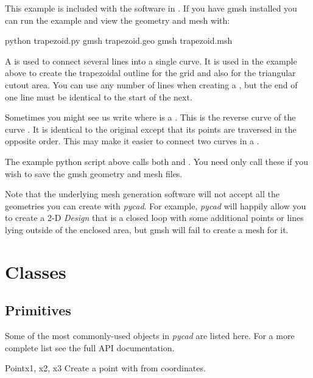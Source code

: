 This example is included with the software in
.  If you have gmsh installed you can
run the example and view the geometry and mesh with:

\begin{python}
	python trapezoid.py
	gmsh trapezoid.geo
	gmsh trapezoid.msh
\end{python}

A  is used to connect several lines into a single curve.
It is used in the example above to create the trapezoidal outline for the grid
and also for the triangular cutout area.
You can use any number of lines when creating a , but
the end of one line must be identical to the start of the next.

Sometimes you might see us write  where  is a
.  This is the reverse curve of the curve . 
It is identical to the original except that its points are traversed
in the opposite order.  This may make it easier to connect two curves
in a .

The example python script above calls both
 and .  You need
only call these if you wish to save the gmsh geometry and mesh files.

Note that the underlying mesh generation software will not accept all
the geometries you can create with {\it pycad}.  For example, {\it
pycad} will happily allow you to create a 2-D {\it Design} that is a
closed loop with some additional points or lines lying outside of the
enclosed area, but gmsh will fail to create a mesh for it.






\section{\pycad Classes}

\subsection{Primitives}

Some of the most commonly-used objects in {\it pycad} are listed here. For a more complete
list see the full API documentation.

\begin{classdesc}{Point}{x1, x2, x3}
Create a point with from coordinates.
\end{classdesc}

